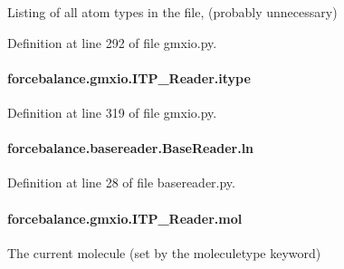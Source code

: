 Listing of all atom types in the file, (probably unnecessary) 



Definition at line 292 of file gmxio.\-py.

\hypertarget{classforcebalance_1_1gmxio_1_1ITP__Reader_a1809bf22503b8647f48ea37c9f6f4cee}{
\paragraph[{itype}]{\setlength{\rightskip}{0pt plus 5cm}forcebalance.\-gmxio.\-I\-T\-P\-\_\-\-Reader.\-itype}}\label{classforcebalance_1_1gmxio_1_1ITP__Reader_a1809bf22503b8647f48ea37c9f6f4cee}


Definition at line 319 of file gmxio.\-py.

\hypertarget{classforcebalance_1_1basereader_1_1BaseReader_ab04436f3968d9bd6ec09238ee6537ec6}{
\paragraph[{ln}]{\setlength{\rightskip}{0pt plus 5cm}forcebalance.\-basereader.\-Base\-Reader.\-ln\hspace{0.3cm}{\ttfamily [inherited]}}}\label{classforcebalance_1_1basereader_1_1BaseReader_ab04436f3968d9bd6ec09238ee6537ec6}


Definition at line 28 of file basereader.\-py.

\hypertarget{classforcebalance_1_1gmxio_1_1ITP__Reader_a8d70d960437fa51e58954d908fdd297d}{
\paragraph[{mol}]{\setlength{\rightskip}{0pt plus 5cm}forcebalance.\-gmxio.\-I\-T\-P\-\_\-\-Reader.\-mol}}\label{classforcebalance_1_1gmxio_1_1ITP__Reader_a8d70d960437fa51e58954d908fdd297d}


The current molecule (set by the moleculetype keyword) 



